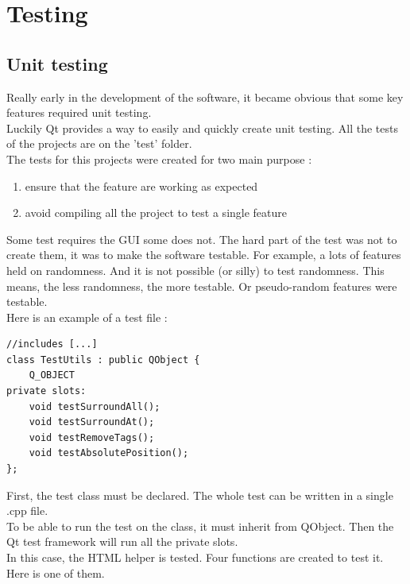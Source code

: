 \part{Testing}
\chapter{Unit testing}
Really early in the development of the software, it became obvious that some key features required unit testing.\\
Luckily Qt provides a way to easily and quickly create unit testing. All the tests of the projects are on the 'test' folder.\\
The tests for this projects were created for two main purpose :
\begin{enumerate}
	\item ensure that the feature are working as expected
	\item avoid compiling all the project to test a single feature
\end{enumerate}
Some test requires the GUI some does not. The hard part of the test was not to create them, it was to make the software testable. For example, a lots of features held on randomness. And it is not possible (or silly) to test randomness. This means, the less randomness, the more testable. Or pseudo-random features were testable.\\
Here is an example of a test file :

\begin{lstlisting}
//includes [...]
class TestUtils : public QObject {
    Q_OBJECT
private slots:
    void testSurroundAll();
    void testSurroundAt();
    void testRemoveTags();
    void testAbsolutePosition();
};
\end{lstlisting}
First, the test class must be declared. The whole test can be written in a single .cpp file.\\
To be able to run the test on the class, it must inherit from QObject. Then the Qt test framework will run all the
private slots.\\
In this case, the HTML helper is tested. Four functions are created to test it.\\
Here is one of them.

